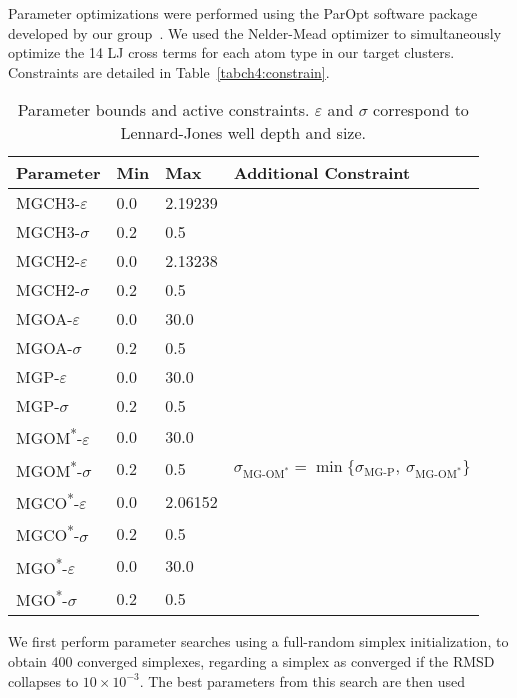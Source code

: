 Parameter optimizations were performed using the ParOpt software package developed by our group~\cite{fogarty:2014:paropt}. We used the Nelder-Mead optimizer to simultaneously optimize
the 14 LJ cross terms for each atom type in our target clusters. Constraints are detailed in Table~\ref{tabch4:constrain}. 
\begin{table}[H]
    \tiny
\begin{tabularx}{\textwidth}{X|X|X|X}
\hline
\textbf{Parameter} & \textbf{Min} & \textbf{Max} & \textbf{Additional Constraint} \\
\hline
MGCH3-$\varepsilon$                   & 0.0 & 2.19239 & \\\hline
MGCH3-$\sigma$                        & 0.2 & 0.5     & \\\hline
MGCH2-$\varepsilon$                   & 0.0 & 2.13238 & \\\hline
MGCH2-$\sigma$                        & 0.2 & 0.5     & \\\hline
MGOA-$\varepsilon$                    & 0.0 & 30.0    & \\\hline
MGOA-$\sigma$                         & 0.2 & 0.5     & \\\hline
MGP-$\varepsilon$                     & 0.0 & 30.0    & \\\hline
MGP-$\sigma$                          & 0.2 & 0.5     & \\\hline
MGOM\textsuperscript{*}-$\varepsilon$ & 0.0 & 30.0    & \\\hline
MGOM\textsuperscript{*}-$\sigma$      & 0.2 & 0.5     & $\sigma_{\text{MG-OM}^*} = \min\big\{\sigma_{\text{MG-P}},\ \sigma_{\text{MG-OM}^*}\big\} $\\\hline
MGCO\textsuperscript{*}-$\varepsilon$ & 0.0 & 2.06152 & \\\hline
MGCO\textsuperscript{*}-$\sigma$      & 0.2 & 0.5     & \\\hline
MGO\textsuperscript{*}-$\varepsilon$  & 0.0 & 30.0    & \\\hline
MGO\textsuperscript{*}-$\sigma$       & 0.2 & 0.5     & \\\hline
\hline
\end{tabularx}
\caption[NM Constraints]{Parameter bounds and active constraints. $\varepsilon$ and $\sigma$ correspond to Lennard-Jones well depth and size.}
\label{tab:constrain}
\end{table}
We first perform parameter searches using a full-random simplex initialization, 
to obtain 400 converged simplexes, regarding a simplex as converged if the RMSD collapses to $10\times{}10^{-3}$. The best parameters from this search are then used
